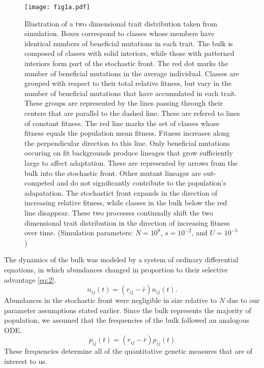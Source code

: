 \documentclass[11pt,twocolumn]{article}
\begin{document}
\begin{figure}[h!]
\texttt{[image: fig1a.pdf]}
\caption{\footnotesize Illustration of a two dimensional trait distribution taken from simulation. Boxes correspond to classes whose members have identical numbers of beneficial mutations in each trait. The bulk is composed of classes with solid interiors, while those with patterned interiors form part of the stochastic front. The red dot marks the number of beneficial mutations in the average individual. Classes are grouped with respect to their total relative fitness, but vary in the number of beneficial mutations that have accumulated in each trait. These groups are represented by the lines passing through their centers that are parallel to the dashed line. These are refered to lines of constant fitness. The red line marks the set of classes whose fitness equals the population mean fitness. Fitness increases along the perpendicular direction to this line. Only beneficial mutations occuring on fit backgrounds produce lineages that grow sufficiently large to affect adaptation. These are represented by arrows from the bulk into the stochastic front. Other mutant lineages are out-competed and do not significantly contribute to the population's adapatation. The stochastict front expands in the direction of increasing relative fitness, while classes in the bulk below the red line disappear. These two processes continually shift the two dimensional trait distribution in the direction of increasing fitness over time. (Simulation parameters: $N=10^9$, $s=10^{-2}$, and $U=10^{-5}$)}\label{fig:1}
\end{figure}


The dynamics of the bulk was modeled by a system of ordinary differential equations, in which abundances changed in proportion to their selective advantage \eqref{eq:2}. 
\begin{equation} \label{eq:2}
\dot{n}_{ij}(t) = (r_{ij}-\bar{r}) n_{ij}(t). 
\end{equation}
Abundances in the stochastic front were negligible in size relative to $N$ due to our parameter assumptions stated earlier.  Since the bulk represents the majority of population, we assumed that the frequencies of the bulk followed an analogous ODE.
\begin{equation} \label{eq:3}
\dot{p}_{ij}(t) = (r_{ij}-\bar{r}) p_{ij}(t) 
\end{equation}
These frequencies determine all of the quantitative genetic measures that are of interest to us.\par
\end{document}
